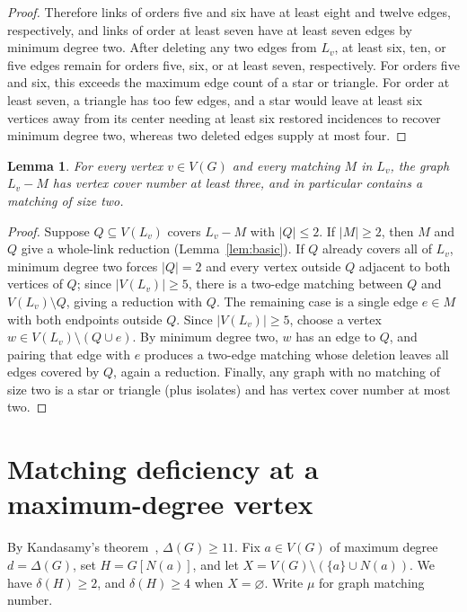 \documentclass[11pt]{article}
\newtheorem{lemma}[theorem]{Lemma}
\begin{document}
\begin{proof}
Therefore links of orders five and six have at least eight and twelve edges, respectively, and links of order at least seven have at least seven edges by minimum degree two. After deleting any two edges from $L_v$, at least six, ten, or five edges remain for orders five, six, or at least seven, respectively. For orders five and six, this exceeds the maximum edge count of a star or triangle. For order at least seven, a triangle has too few edges, and a star would leave at least six vertices away from its center needing at least six restored incidences to recover minimum degree two, whereas two deleted edges supply at most four.
\end{proof}

\begin{lemma}\label{lem:vc-after-matching}
For every vertex $v\in V(G)$ and every matching $M$ in $L_v$, the graph $L_v-M$ has vertex cover number at least three, and in particular contains a matching of size two.
\end{lemma}

\begin{proof}
Suppose $Q\subseteq V(L_v)$ covers $L_v-M$ with $|Q|\leq 2$. If $|M|\geq 2$, then $M$ and $Q$ give a whole-link reduction (Lemma~\ref{lem:basic}). If $Q$ already covers all of $L_v$, minimum degree two forces $|Q|=2$ and every vertex outside $Q$ adjacent to both vertices of $Q$; since $|V(L_v)|\geq 5$, there is a two-edge matching between $Q$ and $V(L_v)\setminus Q$, giving a reduction with $Q$. The remaining case is a single edge $e\in M$ with both endpoints outside $Q$. Since $|V(L_v)|\geq 5$, choose a vertex $w\in V(L_v)\setminus(Q\cup e)$. By minimum degree two, $w$ has an edge to $Q$, and pairing that edge with $e$ produces a two-edge matching whose deletion leaves all edges covered by $Q$, again a reduction. Finally, any graph with no matching of size two is a star or triangle (plus isolates) and has vertex cover number at most two.
\end{proof}

\section{Matching deficiency at a maximum-degree vertex}

By Kandasamy's theorem~\cite{Kandasamy}, $\Delta(G)\geq 11$. Fix $a\in V(G)$ of maximum degree $d=\Delta(G)$, set $H=G[N(a)]$, and let $X=V(G)\setminus(\{a\}\cup N(a))$. We have $\delta(H)\geq 2$, and $\delta(H)\geq 4$ when $X=\varnothing$. Write $\mu$ for graph matching number.
\end{document}
